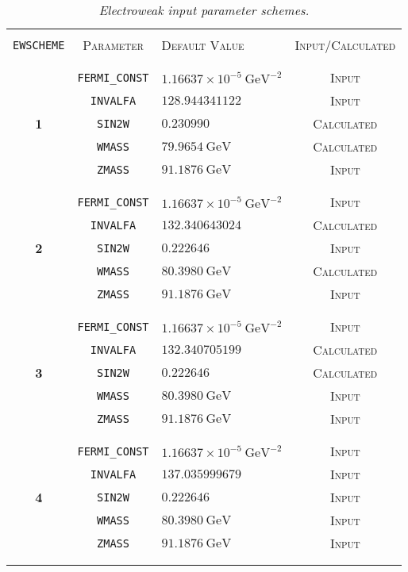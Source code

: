 \documentclass[a4paper,11pt]{article}
\begin{document}
\begin{table}[t!]
\newcommand{\lstrut}{{$\strut\atop\strut$}}
\begin{center}
\begin{tabular}{c|c|l|c}
\hline
&&&\\
{\tt EWSCHEME} & \textsc{Parameter} & \textsc{Default Value} & \textsc{Input/Calculated} \\
&&&\\
\hline
&&&\\
 & {\tt FERMI\_CONST} & $1.16637\times 10^{-5} \ \mathrm{GeV}^{-2}$ & \textsc{Input}\\
 & {\tt INVALFA} & $128.944341122$ & \textsc{Input}\\
\bf 1 & {\tt SIN2W} & $0.230990$ & \textsc{Calculated} \\
 & {\tt WMASS} & $79.9654 \ \mathrm{GeV}$ & \textsc{Calculated}\\
 & {\tt ZMASS} & $91.1876 \ \mathrm{GeV}$ & \textsc{Input}\\
&&&\\
\hline
&&&\\
 & {\tt FERMI\_CONST} & $1.16637 \times 10^{-5} \ \mathrm{GeV}^{-2}$ & \textsc{Input}\\
 & {\tt INVALFA} & $132.340643024$ & \textsc{Calculated}\\
\bf 2 & {\tt SIN2W} & $0.222646$ & \textsc{Input}\\
 & {\tt WMASS} & $ 80.3980 \ \mathrm{GeV}$ & \textsc{Calculated}\\
 & {\tt ZMASS} & $91.1876 \ \mathrm{GeV}$ & \textsc{Input}\\
&&&\\
\hline
&&&\\
 &{\tt FERMI\_CONST} & $1.16637 \times 10^{-5} \ \mathrm{GeV}^{-2}$ & \textsc{Input}\\
 &{\tt INVALFA} & $132.340705199$ & \textsc{Calculated}\\
\bf 3 &{\tt SIN2W} & $0.222646$ & \textsc{Calculated}\\
 &{\tt WMASS} & $80.3980 \ \mathrm{GeV}$ & \textsc{Input}\\
 & {\tt ZMASS} & $91.1876 \ \mathrm{GeV}$ & \textsc{Input}\\
&&&\\
\hline
&&&\\
 &{\tt  FERMI\_CONST} & $1.16637 \times 10^{-5} \ \mathrm{GeV}^{-2}$ & \textsc{Input}\\
 &{\tt  INVALFA} & $137.035999679$ & \textsc{Input}\\
\bf 4 &{\tt  SIN2W} & $0.222646$ & \textsc{Input}\\
 &{\tt  WMASS} & $80.3980 \ \mathrm{GeV}$ & \textsc{Input}\\
 &{\tt  ZMASS} & $91.1876 \ \mathrm{GeV}$ & \textsc{Input}\\
&&&\\
\hline
&&&\\
\end{tabular}
\caption {\em  Electroweak input parameter schemes.}
\vspace{0.2cm}
\label{tab:Schemes}
\end{center}
\end{table}
\end{document}
